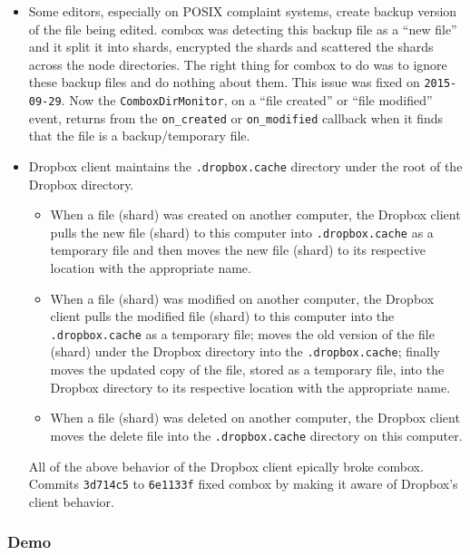 \begin{itemize}
\item Some editors, especially on POSIX complaint systems, create
  backup version of the file being edited. combox was detecting this
  backup file as a ``new file'' and it split it into shards, encrypted
  the shards and scattered the shards across the node directories. The
  right thing for combox to do was to ignore these backup files and do
  nothing about them. This issue was fixed on
  \verb+2015-09-29+\cite{combox-issue-tracker}. Now the
  \verb+ComboxDirMonitor+, on a ``file created'' or ``file modified''
  event, returns from the \verb+on_created+ or \verb+on_modified+
  callback when it finds that the file is a backup/temporary file.
\item Dropbox client maintains the \verb+.dropbox.cache+ directory
  under the root of the Dropbox directory.

  \begin{itemize}
  \item When a file (shard) was created on another computer, the
    Dropbox client pulls the new file (shard) to this computer into
    \verb+.dropbox.cache+ as a temporary file and then moves the new
    file (shard) to its respective location with the appropriate name.
  \item When a file (shard) was modified on another computer, the
    Dropbox client pulls the modified file (shard) to this computer
    into the \verb+.dropbox.cache+ as a temporary file; moves the old
    version of the file (shard) under the Dropbox directory into the
    \verb+.dropbox.cache+; finally moves the updated copy of the file,
    stored as a temporary file, into the Dropbox directory to its
    respective location with the appropriate name.
  \item When a file (shard) was deleted on another computer, the
    Dropbox client moves the delete file into the
    \verb+.dropbox.cache+ directory on this computer.
  \end{itemize}

  All of the above behavior of the Dropbox client epically broke
  combox. Commits \verb+3d714c5+ to
  \verb+6e1133f+\cite{git:dropbox-fix} fixed combox by making it aware
  of Dropbox's client behavior.
\end{itemize}

\subsubsection{Demo}

